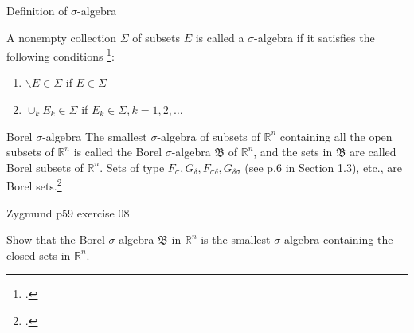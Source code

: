 \documentclass[UTF8,a4paper,10pt]{article}
\begin{document}
\begin{mybox}{Definition of \(\sigma\)-algebra}

  A nonempty collection \(\Sigma\) of subsets \(E\) is called a \(\sigma\)-algebra if it satisfies the following conditions \footcite[][49]{Wheeden_Zygmund_2015}:
  \begin{enumerate}[label=(\roman*)]
    \item \(\backslash E \in \Sigma\) if \(E \in \Sigma\)
    \item \(\cup_k E_k \in \Sigma\) if \(E_k \in \Sigma, k=1,2,\ldots\)
  \end{enumerate}
  

\end{mybox}
  

\begin{mybox}{Borel \(\sigma\)-algebra}
  The smallest \(\sigma\)-algebra of subsets of \(\mathbb{R}^n\) containing all the open subsets of
\(\mathbb{R}^n\) is called the Borel \(\sigma\)-algebra \(\mathfrak{B}\) of \(\mathbb{R}^n\), and the sets in \(\mathfrak{B}\) are called Borel subsets of \(\mathbb{R}^n\). Sets of type \(F_\sigma, G_\delta, F_{\sigma\delta}, G_{\delta\sigma}\) (see p.6 in Section 1.3), etc., are Borel sets.\footcite[][49]{Wheeden_Zygmund_2015}  


\end{mybox}




  \begin{Problem}[]{Zygmund p59 exercise 08}

    Show that the Borel \(\sigma\)-algebra \(\mathfrak{B}\)  in \(\mathbb{R}^n\)  is the smallest \(\sigma\)-algebra containing the closed sets in \(\mathbb{R}^n\).
  \end{Problem}
\end{document}
